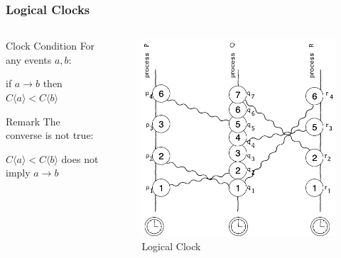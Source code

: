 \documentclass{beamer}
\begin{document}
\frame
{
	\frametitle{Logical Clocks}

	\begin{columns}
	\begin{column}{0.6\textwidth}

		\begin{block}{Clock Condition}
			For any events $a,b$:

			if $a\to b$ then $C\langle a\rangle < C\langle b\rangle$
		\end{block}

		\begin{block}{Remark}
			The converse is not true:

			$C\langle a\rangle < C\langle b\rangle$ does not imply $a\to b$
		\end{block}


	\end{column}
	\begin{column}{0.4\textwidth}

		\begin{figure}[ht!]
		\includegraphics[width=\textwidth]{files/ClockDist-Logical-Clock.png}
		\caption{Logical Clock}
		\end{figure}


	\end{column}
	\end{columns}


}
\end{document}
